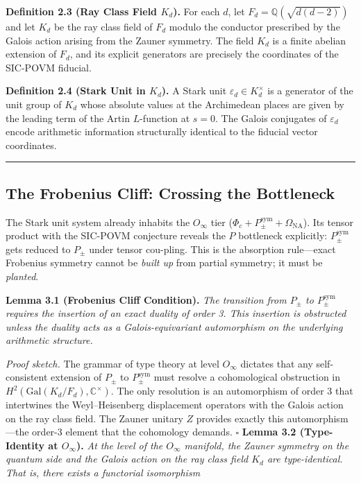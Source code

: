 \documentclass[12pt,a4paper]{article}
\begin{document}
\textbf{Definition 2.3 (Ray Class Field $K_d$).} For each $d$, let $F_d = \mathbb{Q}(\sqrt{d(d-2)})$ and let $K_d$ be the ray class field of $F_d$ modulo the conductor prescribed by the Galois action arising from the Zauner symmetry. The field $K_d$ is a finite abelian extension of $F_d$, and its explicit generators are precisely the coordinates of the SIC-POVM fiducial.

\textbf{Definition 2.4 (Stark Unit in $K_d$).} A Stark unit $\varepsilon_d \in K_d^\times$ is a generator of the unit group of $K_d$ whose absolute values at the Archimedean places are given by the leading term of the Artin $L$-function at $s=0$. The Galois conjugates of $\varepsilon_d$ encode arithmetic information structurally identical to the fiducial vector coordinates.

\begin{center}
\rule{0.5\textwidth}{0.4pt}
\end{center}

\subsection{The Frobenius Cliff: Crossing the Bottleneck}

The Stark unit system already inhabits the $O_{\infty}$ tier ($\Phi_c + P_{\pm}^{\text{sym}} + \Omega_{\text{NA}}$). Its tensor product with the SIC-POVM conjecture reveals the $P$ bottleneck explicitly: $P_{\pm}^{\text{sym}}$ gets reduced to $P_{\pm}$ under tensor cou-pling. This is the absorption rule---exact Frobenius symmetry cannot be \emph{built up} from partial symmetry; it must be \emph{planted}.

\textbf{Lemma 3.1 (Frobenius Cliff Condition).} \emph{The transition from $P_{\pm}$ to $P_{\pm}^{\text{sym}}$ requires the insertion of an exact duality of order 3. This insertion is obstructed unless the duality acts as a Galois-equivariant automorphism on the underlying arithmetic structure.}

\emph{Proof sketch.} The grammar of type theory at level $O_{\infty}$ dictates that any self-consistent extension of $P_{\pm}$ to $P_{\pm}^{\text{sym}}$ must resolve a cohomological obstruction in $H^2(\text{Gal}(K_d/F_d), \mathbb{C}^\times)$. The only resolution is an automorphism of order 3 that intertwines the Weyl--Heisenberg displacement operators with the Galois action on the ray class field. The Zauner unitary $Z$ provides exactly this automorphism---the order-3 element that the cohomology demands. $\square$
\textbf{Lemma 3.2 (Type-Identity at $O_{\infty}$).} \emph{At the level of the $O_{\infty}$ manifold, the Zauner symmetry on the quantum side and the Galois action on the ray class field $K_d$ are type-identical. That is, there exists a functorial isomorphism}
\end{document}
